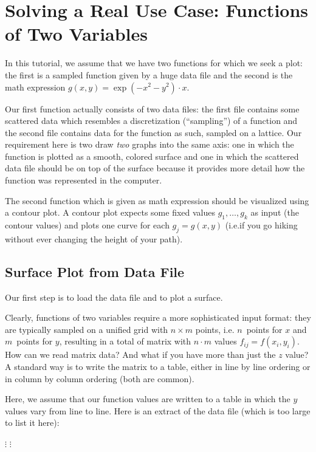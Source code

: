 
\section[tutorial4]{Solving a Real Use Case: Functions of Two Variables}

In this tutorial, we assume that we have two functions for which we seek a
plot: the first is a sampled function given by a huge data file and the second
is the math expression $g(x,y)=\exp(-x^2-y^2)\cdot x$.

Our first function actually consists of two data files: the first file contains
some scattered data which resembles a discretization (``sampling'') of a
function and the second file contains data for the function as such, sampled on
a lattice. Our requirement here is two draw \emph{two} graphs into the same
axis: one in which the function is plotted as a smooth, colored surface and one
in which the scattered data file should be on top of the surface because it
provides more detail how the function was represented in the computer.

The second function which is given as math expression should be visualized
using a contour plot. A contour plot expects some fixed values $g_1, \dotsc,
g_k$ as input (the contour values) and plots one curve for each $g_j = g(x,y)$
(i.e.\@ if you go hiking without ever changing the height of your path).


\subsection{Surface Plot from Data File}

Our first step is to load the data file and to plot a surface.

Clearly, functions of two variables require a more sophisticated input format:
they are typically sampled on a unified grid with $n \times m$ points, i.e.\@
$n$~points for $x$ and $m$~points for $y$, resulting in a total of matrix with
$n\cdot m$ values $f_{ij} = f(x_i,y_i)$. How can we read matrix data? And what
if you have more than just the $z$ value? A standard way is to write the matrix
to a table, either in line by line ordering or in column by column ordering
(both are common).

Here, we assume that our function values are written to a table in which the
$y$ values vary from line to line. Here is an extract of the data file (which
is too large to list it here):

        \baselineskip
            $\vdots$
        \baselineskip
        \baselineskip
            $\vdots$

